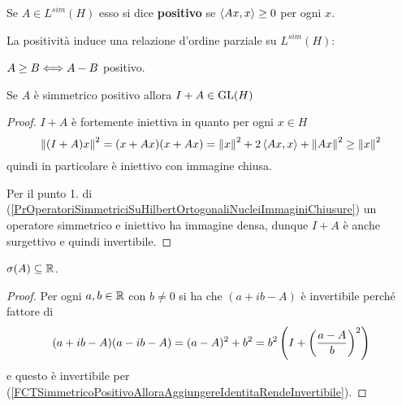 \begin{definition}
Se $A\in L^{sim}(H)$ esso si dice \textbf{positivo} se $\left\langle {Ax,x}\right\rangle\geq 0$ per ogni $x$.
\end{definition}
\begin{remark}
La positivit\`a induce una relazione d'ordine parziale su $L^{sim}(H)$: 
\begin{center}
    $A\geq B\Longleftrightarrow A-B$ positivo.
\end{center}
\end{remark}

\begin{fact}[]\label{FCTSimmetricoPositivoAlloraAggiungereIdentitaRendeInvertibile}
Se $A$ \`e simmetrico positivo allora $I+A\in \mathrm{GL}(H)$
\end{fact}
\begin{proof}
$I+A$ \`e fortemente iniettiva in quanto per ogni $x\in H$
\[\left\Vert{(I+A)x}\right\Vert^2=(x+Ax)(x+Ax)=\left\Vert{x}\right\Vert^2+2\left\langle {Ax,x}\right\rangle+\left\Vert{Ax}\right\Vert^2\geq \left\Vert{x}\right\Vert^2\]
quindi in particolare \`e iniettivo con immagine chiusa.

Per il punto 1. di (\ref{PrOperatoriSimmetriciSuHilbertOrtogonaliNucleiImmaginiChiusure}) un operatore simmetrico e iniettivo ha immagine densa, dunque $I+A$ \`e anche surgettivo e quindi invertibile.
\end{proof}


\begin{proposition}[]\label{PrSpettroOperatoreSimmetricoEReale}
$\sigma(A)\subseteq \mathbb{R}$.
\end{proposition}
\begin{proof}
Per ogni $a,b\in\mathbb{R}$ con $b\neq 0$ si ha che $(a+ib-A)$ \`e invertibile perch\'e fattore di
\[(a+ib-A)(a-ib -A)=(a-A)^2+b^2=b^2\left({I+\left({\frac{a-A}b}\right)^2}\right)\]
e questo \`e invertibile per (\ref{FCTSimmetricoPositivoAlloraAggiungereIdentitaRendeInvertibile}).
\end{proof}







